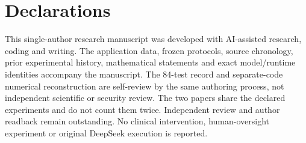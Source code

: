 \documentclass[11pt,letterpaper]{article}
\begin{document}
\section*{Declarations}

This single-author research manuscript was developed with AI-assisted research, coding and writing. The application data, frozen protocols, source chronology, prior experimental history, mathematical statements and exact model/runtime identities accompany the manuscript. The 84-test record and separate-code numerical reconstruction are self-review by the same authoring process, not independent scientific or security review. The two papers share the declared experiments and do not count them twice. Independent review and author readback remain outstanding. No clinical intervention, human-oversight experiment or original DeepSeek execution is reported.
\end{document}
